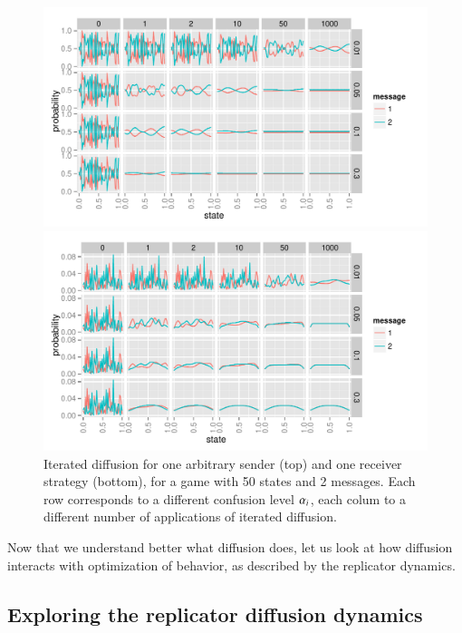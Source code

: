 \begin{figure}
  \centering

  \includegraphics[width=\textwidth]{plots/confusion_sender.pdf}
  
  \includegraphics[width=\textwidth]{plots/confusion_receiver.pdf}

  \caption{Iterated diffusion for one arbitrary sender (top) and one
    receiver strategy (bottom), for a game with 50 states and 2
    messages. Each row corresponds to a different confusion level
    $\alpha_i$, each colum to a different number of applications of
    iterated diffusion.}
  \label{fig:confusion-SenRec}
\end{figure}

Now that we understand better what diffusion does, let us look at how
diffusion interacts with optimization of behavior, as described by the
replicator dynamics.

\subsection{Exploring the replicator diffusion dynamics}
\label{sec:simulations}

